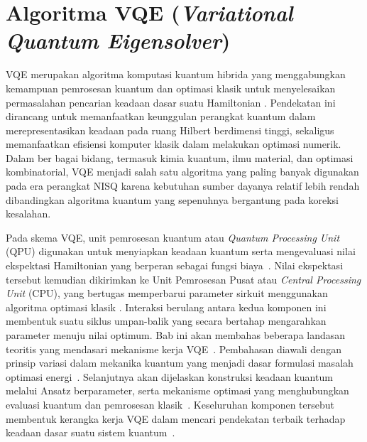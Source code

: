 \section{Algoritma VQE (\textit{Variational Quantum Eigensolver})}
\label{sec:algoritma-vqe}
VQE merupakan algoritma komputasi kuantum hibrida yang menggabungkan kemampuan pemrosesan kuantum dan optimasi klasik untuk menyelesaikan permasalahan pencarian keadaan dasar suatu Hamiltonian . Pendekatan ini dirancang untuk memanfaatkan keunggulan perangkat kuantum dalam merepresentasikan keadaan pada ruang Hilbert berdimensi tinggi, sekaligus memanfaatkan efisiensi komputer klasik dalam melakukan optimasi numerik. Dalam ber bagai bidang, termasuk kimia kuantum, ilmu material, dan optimasi kombinatorial, VQE menjadi salah satu algoritma yang paling banyak digunakan pada era perangkat NISQ karena kebutuhan sumber dayanya relatif lebih rendah dibandingkan algoritma kuantum yang sepenuhnya bergantung pada koreksi kesalahan. 

Pada skema VQE, unit pemrosesan kuantum atau \textit{Quantum Processing Unit} (QPU) digunakan untuk menyiapkan keadaan kuantum serta mengevaluasi nilai ekspektasi Hamiltonian yang berperan sebagai fungsi biaya~. Nilai ekspektasi tersebut kemudian dikirimkan ke Unit Pemrosesan Pusat atau \textit{Central Processing Unit} (CPU), yang bertugas memperbarui parameter sirkuit menggunakan algoritma optimasi klasik . Interaksi berulang antara kedua komponen ini membentuk suatu siklus umpan-balik yang secara bertahap mengarahkan parameter menuju nilai optimum. Bab ini akan membahas beberapa landasan teoritis yang mendasari mekanisme kerja VQE~\cite{dao_exploring_2025}. Pembahasan diawali dengan prinsip variasi dalam mekanika kuantum yang menjadi dasar formulasi masalah optimasi energi~\cite{regadio_exoplanet_2025}. Selanjutnya akan dijelaskan konstruksi keadaan kuantum melalui Ansatz berparameter, serta mekanisme optimasi yang menghubungkan evaluasi kuantum dan pemrosesan klasik~. Keseluruhan komponen tersebut membentuk kerangka kerja VQE dalam mencari pendekatan terbaik terhadap keadaan dasar suatu sistem kuantum~.


